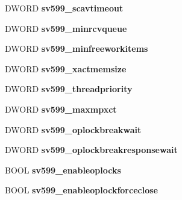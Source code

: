 \begin{DoxyCompactItemize}
D\+W\+O\+RD {\bfseries sv599\+\_\+scavtimeout}
\item 
\mbox{\label{struct___s_e_r_v_e_r___i_n_f_o__599_a11caa9c165982ccc3678aa7ded498cb7}} 
D\+W\+O\+RD {\bfseries sv599\+\_\+minrcvqueue}
\item 
\mbox{\label{struct___s_e_r_v_e_r___i_n_f_o__599_a5f70e3d051230af1df3007edcfbe2ec7}} 
D\+W\+O\+RD {\bfseries sv599\+\_\+minfreeworkitems}
\item 
\mbox{\label{struct___s_e_r_v_e_r___i_n_f_o__599_a5d711c9a990cb4faa9bad06a17c632cb}} 
D\+W\+O\+RD {\bfseries sv599\+\_\+xactmemsize}
\item 
\mbox{\label{struct___s_e_r_v_e_r___i_n_f_o__599_a68240514a76560d78cbe2928c7400948}} 
D\+W\+O\+RD {\bfseries sv599\+\_\+threadpriority}
\item 
\mbox{\label{struct___s_e_r_v_e_r___i_n_f_o__599_a64374142761c113df54c4e194c3d7d99}} 
D\+W\+O\+RD {\bfseries sv599\+\_\+maxmpxct}
\item 
\mbox{\label{struct___s_e_r_v_e_r___i_n_f_o__599_a7f279b6c53c1b837ef901f2c7b82ba60}} 
D\+W\+O\+RD {\bfseries sv599\+\_\+oplockbreakwait}
\item 
\mbox{\label{struct___s_e_r_v_e_r___i_n_f_o__599_a263d80d81a73b169ca9390a524319b6c}} 
D\+W\+O\+RD {\bfseries sv599\+\_\+oplockbreakresponsewait}
\item 
\mbox{\label{struct___s_e_r_v_e_r___i_n_f_o__599_adf3dfc95263d01c85befcdb5009e6d0a}} 
B\+O\+OL {\bfseries sv599\+\_\+enableoplocks}
\item 
\mbox{\label{struct___s_e_r_v_e_r___i_n_f_o__599_a58b2b99bf74174e913b7a8863828b887}} 
B\+O\+OL {\bfseries sv599\+\_\+enableoplockforceclose}
\item 
\mbox{\label{struct___s_e_r_v_e_r___i_n_f_o__599_ac47b82e969dc5c24069ee65d1589dcd4}} 

\end{DoxyCompactItemize}
